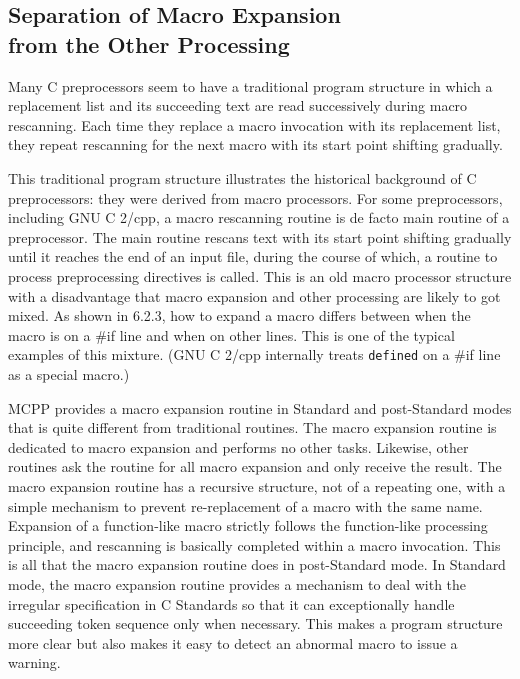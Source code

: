 \documentclass[twocolumn]{article}
\begin{document}
\subsection{Separation of Macro Expansion \\
from the Other Processing}

Many C preprocessors seem to have a traditional program structure in which a replacement list and its succeeding text are read successively during macro rescanning.  Each time they replace a macro invocation with its replacement list, they repeat rescanning for the next macro with its start point shifting gradually.

This traditional program structure illustrates the historical background of C preprocessors: they were derived from macro processors.  For some preprocessors, including GNU C 2/cpp, a macro rescanning routine is de facto main routine of a preprocessor.  The main routine rescans text with its start point shifting gradually until it reaches the end of an input file, during the course of which, a routine to process preprocessing directives is called.  This is an old macro processor structure with a disadvantage that macro expansion and other processing are likely to got mixed.  As shown in 6.2.3, how to expand a macro differs between when the macro is on a \#if line and when on other lines.  This is one of the typical examples of this mixture.  (GNU C 2/cpp internally treats \verb|defined| on a \#if line as a special macro.)

MCPP provides a macro expansion routine in Standard and post-Standard modes that is quite different from traditional routines.  The macro expansion routine is dedicated to macro expansion and performs no other tasks.  Likewise, other routines ask the routine for all macro expansion and only receive the result.  The macro expansion routine has a recursive structure, not of a repeating one, with a simple mechanism to prevent re-replacement of a macro with the same name.  Expansion of a function-like macro strictly follows the function-like processing principle, and rescanning is basically completed within a macro invocation.  This is all that the macro expansion routine does in post-Standard mode.  In Standard mode, the macro expansion routine provides a mechanism to deal with the irregular specification in C Standards so that it can exceptionally handle succeeding token sequence only when necessary.  This makes a program structure more clear but also makes it easy to detect an abnormal macro to issue a warning.
\end{document}
